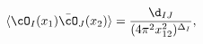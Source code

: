 \begin{equation} \label{2pt}
\langle {\cO}_I (x_1) \bar\cO_J(x_2) \rangle = \frac{\d_{IJ}}{(4 \pi^2
x_{12}^2)^{\Delta_I}},
\end{equation}

